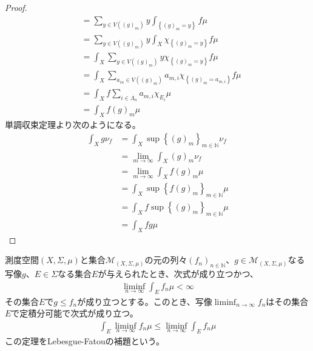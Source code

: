 \documentclass[dvipdfmx]{jsarticle}
\begin{document}
\begin{proof}
\begin{align*}
&= \sum_{y \in V\left( (g)_{m} \right)} {y\int_{\left\{ (g)_{m} = y \right\}} {f\mu}}\\
&= \sum_{y \in V\left( (g)_{m} \right)} {y\int_{X} {\chi_{\left\{ (g)_{m} = y \right\}}f\mu}}\\
&= \int_{X} {\sum_{y \in V\left( (g)_{m} \right)} {y\chi_{\left\{ (g)_{m} = y \right\}}f}\mu}\\
&= \int_{X} {\sum_{a_{in} \in V\left( (g)_{m} \right)} {a_{m,i}\chi_{\left\{ (g)_{m} = a_{m,i} \right\}}f}\mu}\\
&= \int_{X} {f\sum_{i \in \varLambda_{n}} {a_{m,i}\chi_{E_{i}}}\mu}\\
&= \int_{X} {f(g)_{m}\mu}
\end{align*}
単調収束定理より次のようになる。
\begin{align*}
\int_{X} {g\nu_{f}} &= \int_{X} {\sup\left\{ (g)_{m} \right\}_{m \in \mathbb{N}}\nu_{f}}\\
&= \lim_{m \rightarrow \infty}{\int_{X} {(g)_{m}\nu_{f}}}\\
&= \lim_{m \rightarrow \infty}{\int_{X} {f(g)_{m}\mu}}\\
&= \int_{X} {\sup\left\{ f(g)_{m} \right\}_{m \in \mathbb{N}}\mu}\\
&= \int_{X} {f\sup\left\{ (g)_{m} \right\}_{m \in \mathbb{N}}\mu}\\
&= \int_{X} {fg\mu}
\end{align*}
\end{proof}
\begin{thm}\label{4.6.2.4}
測度空間$(X,\varSigma,\mu)$と集合$\mathcal{M}_{(X,\varSigma,\mu)}$の元の列々$\left( f_{n} \right)_{n \in \mathbb{N}}$、$g \in \mathcal{M}_{(X,\varSigma,\mu)}$なる写像$g$、$E \in \varSigma$なる集合$E$が与えられたとき、次式が成り立つかつ、
\begin{align*}
\liminf_{n \rightarrow \infty}{\int_{E} {f_{n}\mu}} < \infty
\end{align*}
その集合$E$で$g \leq f_{n}$が成り立つとする。このとき、写像$\liminf_{n \rightarrow \infty}f_{n}$はその集合$E$で定積分可能で次式が成り立つ。
\begin{align*}
\int_{E} {\liminf_{n \rightarrow \infty}f_{n}\mu} \leq \liminf_{n \rightarrow \infty}{\int_{E} {f_{n}\mu}}
\end{align*}
この定理をLebesgue-Fatouの補題という。
\end{thm}
\end{document}
